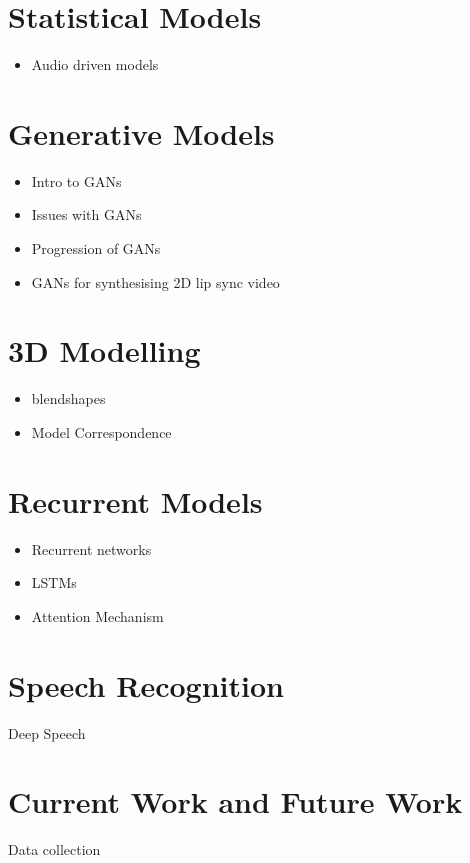 \documentclass[12pt]{article}
\begin{document}
\section{Statistical Models}
\begin{itemize}
    \item Audio driven models
\end{itemize}

\section{Generative Models}
\begin{itemize}
    \item Intro to GANs
    \item Issues with GANs
    \item Progression of GANs
    \item GANs for synthesising 2D lip sync video
\end{itemize}

\section{3D Modelling}
\begin{itemize}
    \item blendshapes
    \item Model Correspondence
\end{itemize}

\section{Recurrent Models}
\begin{itemize}
    \item Recurrent networks
    \item LSTMs
    \item Attention Mechanism
\end{itemize}


\section{Speech Recognition}
Deep Speech \cite{Karras2017a}

\section{Current Work and Future Work}
Data collection



\end{document}
